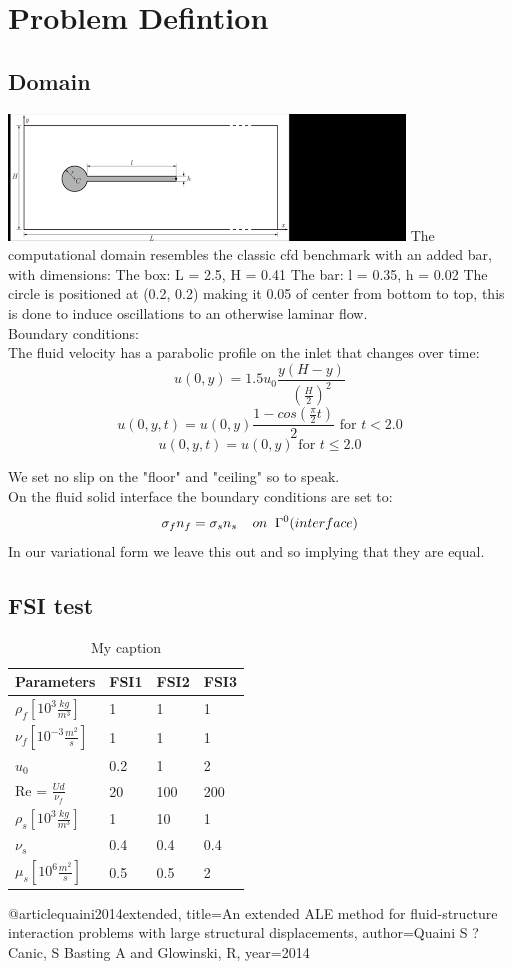 \newpage

\section*{Problem Defintion}
\subsection*{Domain}
\includegraphics[scale=0.9]{geometry.png}
The computational domain resembles the classic cfd benchmark with an added bar, with dimensions:
The box: L = 2.5, H = 0.41
The bar: l = 0.35, h = 0.02
The circle is positioned at (0.2, 0.2) making it 0.05 of center from bottom to top, this is done to induce oscillations to an otherwise laminar flow.\\
Boundary conditions:\\
The fluid velocity has a parabolic profile on the inlet that changes over time:\\
$$ u(0,y) = 1.5u_0 \frac{y(H-y)}{(\frac{H}{2})^2}  $$
$$ u(0,y,t) = u(0,y)\frac{1-cos(\frac{\pi}{2}t)}{2} \text{  for  } t<2.0$$
$$ u(0,y,t) = u(0,y) \text{  for  } t \leq 2.0 $$

We set no slip on the "floor" and "ceiling" so to speak.\\
On the fluid solid interface the boundary conditions are set to:
$$  \sigma_f n_f = \sigma_s n_s \hspace{4mm} on  \hspace{2mm}\Gamma^0 (interface)   $$
In our variational form we leave this out and so implying that they are equal.


\subsection*{FSI test}
\begin{table}[h]
\centering
\caption{My caption}
\label{my-label}
\begin{tabular}{|l|l|l|l|}
\hline
Parameters & FSI1 & FSI2 & FSI3 \\ \hline
$\rho_f[10^3 \frac{kg}{m^3}]$ & 1 & 1 & 1 \\ \hline
$\nu_f [10^{-3} \frac{m^2}{s}]$ & 1 & 1 & 1 \\ \hline
$u_0$ & 0.2 & 1 & 2 \\ \hline
Re = $\frac{U d}{\nu_f}$ & 20 & 100 & 200 \\ \hline
$\rho_s[10^3 \frac{kg}{m^3}]$ & 1 & 10 & 1 \\ \hline
$\nu_s$ & 0.4 & 0.4 & 0.4 \\ \hline
$\mu_s[10^6 \frac{m^2}{s}]$ & 0.5 & 0.5 & 2 \\ \hline
\end{tabular}
\end{table}









@article{quaini2014extended,
  title={An extended ALE method for fluid-structure interaction problems with large structural displacements},
  author={Quaini S ?Canic, S Basting A and Glowinski, R},
  year={2014}
}



